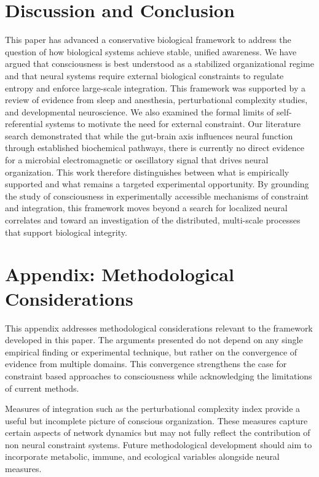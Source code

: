 \documentclass[12pt,letterpaper]{article}
\begin{document}
\section{Discussion and Conclusion}

This paper has advanced a conservative biological framework to address the question of how biological systems achieve stable, unified awareness. We have argued that consciousness is best understood as a stabilized organizational regime and that neural systems require external biological constraints to regulate entropy and enforce large-scale integration. This framework was supported by a review of evidence from sleep and anesthesia, perturbational complexity studies, and developmental neuroscience. We also examined the formal limits of self-referential systems to motivate the need for external constraint. Our literature search demonstrated that while the gut-brain axis influences neural function through established biochemical pathways, there is currently no direct evidence for a microbial electromagnetic or oscillatory signal that drives neural organization. This work therefore distinguishes between what is empirically supported and what remains a targeted experimental opportunity. By grounding the study of consciousness in experimentally accessible mechanisms of constraint and integration, this framework moves beyond a search for localized neural correlates and toward an investigation of the distributed, multi-scale processes that support biological integrity.

\appendix
\section{Appendix: Methodological Considerations}

This appendix addresses methodological considerations relevant to the framework developed in this paper. The arguments presented do not depend on any single empirical finding or experimental technique, but rather on the convergence of evidence from multiple domains. This convergence strengthens the case for constraint based approaches to consciousness while acknowledging the limitations of current methods.

Measures of integration such as the perturbational complexity index provide a useful but incomplete picture of conscious organization. These measures capture certain aspects of network dynamics but may not fully reflect the contribution of non neural constraint systems. Future methodological development should aim to incorporate metabolic, immune, and ecological variables alongside neural measures.
\end{document}
